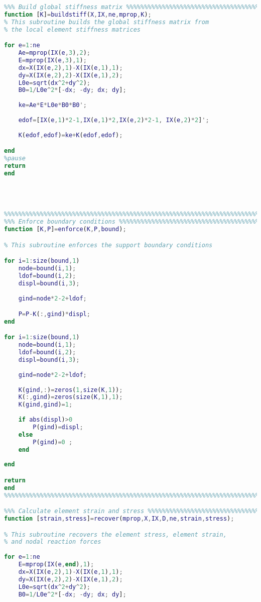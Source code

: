 \begin{lstlisting}[language=Matlab, caption = FE implementation for Linear truss analysis, label=lst:CodeLinear]
%%%%%%%%%%%%%%%%%%%%%%%%%%%%%%%%%%%%%%%%%%%%%%%%%%%%%%%%%%%%%%%%%%%%%%%%%%%
%%% Build global stiffness matrix %%%%%%%%%%%%%%%%%%%%%%%%%%%%%%%%%%%%%%%%%
function [K]=buildstiff(X,IX,ne,mprop,K);
% This subroutine builds the global stiffness matrix from
% the local element stiffness matrices

for e=1:ne
    Ae=mprop(IX(e,3),2);
    E=mprop(IX(e,3),1);
    dx=X(IX(e,2),1)-X(IX(e,1),1);
    dy=X(IX(e,2),2)-X(IX(e,1),2);
    L0e=sqrt(dx^2+dy^2);
    B0=1/L0e^2*[-dx; -dy; dx; dy];
    
    ke=Ae*E*L0e*B0*B0';
    
    edof=[IX(e,1)*2-1,IX(e,1)*2,IX(e,2)*2-1, IX(e,2)*2]';
    
    K(edof,edof)=ke+K(edof,edof);

end
%pause
return
end




%%%%%%%%%%%%%%%%%%%%%%%%%%%%%%%%%%%%%%%%%%%%%%%%%%%%%%%%%%%%%%%%%%%%%%%%%%%
%%% Enforce boundary conditions %%%%%%%%%%%%%%%%%%%%%%%%%%%%%%%%%%%%%%%%%%%
function [K,P]=enforce(K,P,bound);

% This subroutine enforces the support boundary conditions

for i=1:size(bound,1)
    node=bound(i,1);
    ldof=bound(i,2);
    displ=bound(i,3);
    
    gind=node*2-2+ldof;

    P=P-K(:,gind)*displ; 
end

for i=1:size(bound,1)
    node=bound(i,1);
    ldof=bound(i,2);
    displ=bound(i,3);
    
    gind=node*2-2+ldof;
    
    K(gind,:)=zeros(1,size(K,1));
    K(:,gind)=zeros(size(K,1),1);
    K(gind,gind)=1;
    
    if abs(displ)>0
        P(gind)=displ; 
    else 
        P(gind)=0 ;
    end
     
end

return
end
%%%%%%%%%%%%%%%%%%%%%%%%%%%%%%%%%%%%%%%%%%%%%%%%%%%%%%%%%%%%%%%%%%%%%%%%%%%

%%% Calculate element strain and stress %%%%%%%%%%%%%%%%%%%%%%%%%%%%%%%%%%%
function [strain,stress]=recover(mprop,X,IX,D,ne,strain,stress);

% This subroutine recovers the element stress, element strain, 
% and nodal reaction forces
        
for e=1:ne
    E=mprop(IX(e,end),1);
    dx=X(IX(e,2),1)-X(IX(e,1),1);
    dy=X(IX(e,2),2)-X(IX(e,1),2);
    L0e=sqrt(dx^2+dy^2);
    B0=1/L0e^2*[-dx; -dy; dx; dy];
    

\end{lstlisting}
